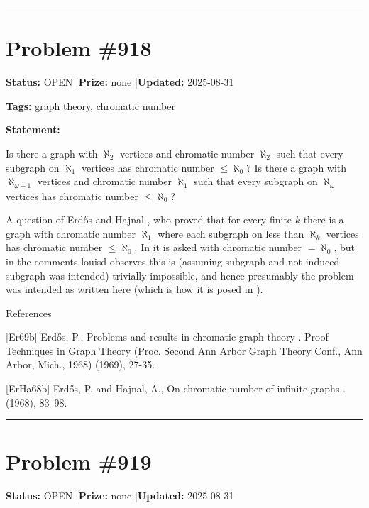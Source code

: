 \documentclass{article}
\begin{document}
\noindent\rule{\linewidth}{0.4pt}


\section{Problem \#918}
\label{prob:918}

\noindent\textbf{Status:} OPEN \quad|\quad \textbf{Prize:} none \quad|\quad \textbf{Updated:} 2025-08-31

\noindent\textbf{Tags:} graph theory, chromatic number

\medskip

\noindent\textbf{Statement:}

Is there a graph with $\aleph_2$ vertices and chromatic number $\aleph_2$ such that every subgraph on $\aleph_1$ vertices has chromatic number $\leq\aleph_0$? Is there a graph with $\aleph_{\omega+1}$ vertices and chromatic number $\aleph_1$ such that every subgraph on $\aleph_\omega$ vertices has chromatic number $\leq\aleph_0$?




A question of Erd\H{o}s and Hajnal \cite{ErHa68b}, who proved that for every finite $k$ there is a graph with chromatic number $\aleph_1$ where each subgraph on less than $\aleph_k$ vertices has chromatic number $\leq \aleph_0$. In \cite{Er69b} it is asked with chromatic number $=\aleph_0$, but in the comments louisd observes this is (assuming subgraph and not induced subgraph was intended) trivially impossible, and hence presumably the problem was intended as written here (which is how it is posed in \cite{ErHa68b}).




References

[Er69b] Erd\H{o}s, P., Problems and results in chromatic graph theory . Proof Techniques in Graph Theory (Proc. Second Ann Arbor Graph Theory Conf., Ann Arbor, Mich., 1968) (1969), 27-35.

[ErHa68b] Erd\H{o}s, P. and Hajnal, A., On chromatic number of infinite graphs . (1968), 83--98.

\noindent\rule{\linewidth}{0.4pt}


\section{Problem \#919}
\label{prob:919}

\noindent\textbf{Status:} OPEN \quad|\quad \textbf{Prize:} none \quad|\quad \textbf{Updated:} 2025-08-31
\end{document}
